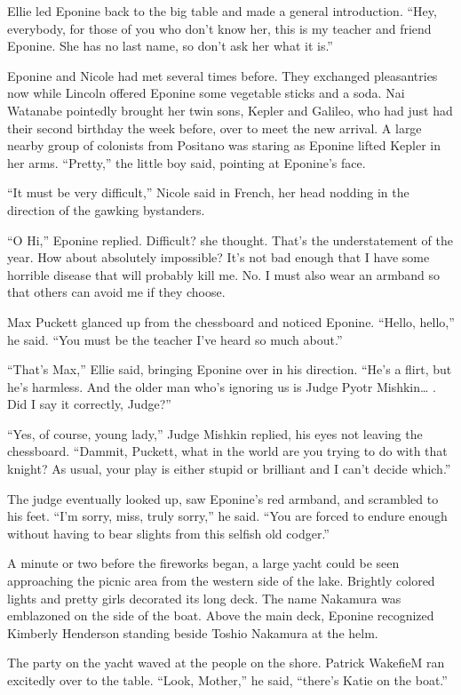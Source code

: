 \documentclass[]{article}
\begin{document}
{Ellie led Eponine back to the big table and made a general introduction. “Hey, everybody, for those of you who don’t know her, this is my teacher and friend Eponine. She has no last name, so don’t ask her what it is.”

Eponine and Nicole had met several times before. They exchanged pleasantries now while Lincoln offered Eponine some vegetable sticks and a soda. Nai Watanabe pointedly brought her twin sons, Kepler and Galileo, who had just had their second birthday the week before, over to meet the new arrival. A large nearby group of colonists from Positano was staring as Eponine lifted Kepler in her arms. “Pretty,” the little boy said, pointing at Eponine’s face.

“It must be very difficult,” Nicole said in French, her head nodding in the direction of the gawking bystanders.

“O Hi,” Eponine replied. Difficult? she thought. That’s the understatement of the year. How about absolutely impossible? It’s not bad enough that I have some horrible disease that will probably kill me. No. I must also wear an armband so that others can avoid me if they choose.

Max Puckett glanced up from the chessboard and noticed Eponine. “Hello, hello,” he said. “You must be the teacher I’ve heard so much about.”

“That’s Max,” Ellie said, bringing Eponine over in his direction. “He’s a flirt, but he’s harmless. And the older man who’s ignoring us is Judge Pyotr Mishkin… . Did I say it correctly, Judge?”

“Yes, of course, young lady,” Judge Mishkin replied, his eyes not leaving the chessboard. “Dammit, Puckett, what in the world are you trying to do with that knight? As usual, your play is either stupid or brilliant and I can’t decide which.”

The judge eventually looked up, saw Eponine’s red armband, and scrambled to his feet. “I’m sorry, miss, truly sorry,” he said. “You are forced to endure enough without having to bear slights from this selfish old codger.”

A minute or two before the fireworks began, a large yacht could be seen approaching the picnic area from the western side of the lake. Brightly colored lights and pretty girls decorated its long deck. The name Nakamura was emblazoned on the side of the boat. Above the main deck, Eponine recognized Kimberly Henderson standing beside Toshio Nakamura at the helm.

The party on the yacht waved at the people on the shore. Patrick WakefieM ran excitedly over to the table. “Look, Mother,” he said, “there’s Katie on the boat.”

}
\end{document}
